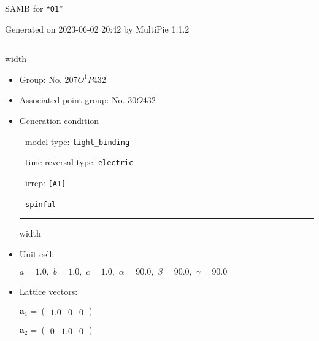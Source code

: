 \documentclass[fleqn,10pt,landscape]{article}
\begin{document}
\setcounter{MaxMatrixCols}{16}

\setlength{\baselineskip}{16pt}
\footnotesize
\begin{center}
\LARGE
SAMB for ``\texttt{O1}''
\end{center}
\begin{flushright}
Generated on 2023-06-02 20:42 by MultiPie 1.1.2
\end{flushright}
\vspace{1cm}


 \hfil \hrule height 1mm width \textwidth \hfil

\begin{itemize}
\item Group: No. 207\quad$O_{}^{1}$\quad$P432$\quad[ cubic ]

\item Associated point group: No. 30\quad$O$\quad$432$\quad[ cubic ]

\vspace{5mm}

\item Generation condition

\quad - model type: \texttt{tight_binding}

\quad - time-reversal type: \texttt{electric}

\quad - irrep: \texttt{[A1]}

\quad - \texttt{spinful}


 \hfil \hrule height 1mm width \textwidth \hfil

\item Unit cell:

\quad $a=1.0,\,\, b=1.0,\,\, c=1.0,\,\, \alpha=90.0,\,\, \beta=90.0,\,\, \gamma=90.0$

\item Lattice vectors:

\quad $\bm{a}_1=\begin{pmatrix} 1.0 & 0 & 0 \end{pmatrix}$

\quad $\bm{a}_2=\begin{pmatrix} 0 & 1.0 & 0 \end{pmatrix}$


\end{itemize}
\end{document}
